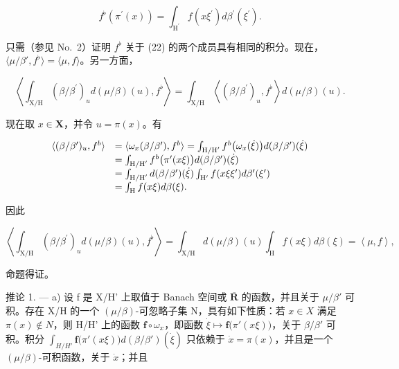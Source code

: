 \[
f ^ {\flat} \left(\pi^ {\prime} (x)\right) = \int_ {\mathrm{H} ^ {\prime}} f \left(x \xi^ {\prime}\right) d \beta^ {\prime} \left(\xi^ {\prime}\right).
\]

只需（参见 No.~2）证明 \(f^{\flat}\) 关于 (22) 的两个成员具有相同的积分。现在，\(\langle \mu / \beta', f^{\flat} \rangle = \langle \mu, f \rangle\)。另一方面，

\[
\left\langle \int_ {\mathrm{X} / \mathrm{H}} \left(\beta / \beta^ {\prime}\right) _ {u} d (\mu / \beta) (u), f ^ {\flat} \right\rangle = \int_ {\mathrm{X} / \mathrm{H}} \left\langle \left(\beta / \beta^ {\prime}\right) _ {u}, f ^ {\flat} \right\rangle d (\mu / \beta) (u).
\]

现在取 \(x \in \mathbf{X}\)，并令 \(u = \pi(x)\)。有

\[
\begin{array}{r l} \langle (\beta / \beta^ {\prime}) _ {u}, f ^ {b} \rangle & = \langle \omega_ {x} (\beta / \beta^ {\prime}), f ^ {b} \rangle = \int_ {\mathrm{H/H} ^ {\prime}} f ^ {b} \big (\omega_ {x} (\dot {\xi}) \big) d (\beta / \beta^ {\prime}) (\dot {\xi}) \\ & = \int_ {\mathrm{H/H} ^ {\prime}} f ^ {b} \big (\pi^ {\prime} (x \xi) \big) d (\beta / \beta^ {\prime}) (\dot {\xi}) \\ & = \int_ {\mathrm{H/H} ^ {\prime}} d (\beta / \beta^ {\prime}) (\dot {\xi}) \int_ {\mathrm{H} ^ {\prime}} f (x \xi \xi^ {\prime}) d \beta^ {\prime} (\xi^ {\prime}) \\ & = \int_ {\mathrm{H}} f (x \xi) d \beta (\xi). \end{array}
\]

因此

\[
\left\langle \int_ {\mathrm{X/H}} (\beta / \beta^ {\prime}) _ {u} d (\mu / \beta) (u), f ^ {\flat} \right\rangle = \int_ {\mathrm{X/H}} d (\mu / \beta) (u) \int_ {\mathrm{H}} f (x \xi) d \beta (\xi) = \left\langle \mu , f \right\rangle ,
\]

命题得证。

推论 1. --- a) 设 f 是 X/H' 上取值于 Banach 空间或 \(\overline{\mathbf{R}}\) 的函数，并且关于 \(\mu/\beta'\) 可积。存在 X/H 的一个 \((\mu/\beta)\)-可忽略子集 N，具有如下性质：若 \(x \in X\) 满足 \(\pi(x) \notin N\)，则 H/H' 上的函数 \(\mathbf{f} \circ \omega_x\)，即函数 \(\dot{\xi} \mapsto \mathbf{f}\big(\pi'(x\xi)\big)\)，关于 \(\beta/\beta'\) 可积。积分 \(\int_{H/H'} \mathbf{f}\big(\pi'(x\xi)\big)d(\beta/\beta')(\dot{\xi})\) 只依赖于 \(\dot{x} = \pi(x)\)，并且是一个 \((\mu/\beta)\)-可积函数，关于 \(\dot{x}\)；并且

